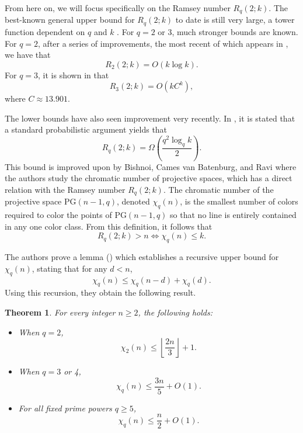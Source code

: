 \documentclass[12pt]{article}
\newtheorem{thm}{Theorem}[section]
\newcommand{\PG}{\text{PG}}
\begin{document}
From here on, we will focus specifically on the Ramsey number $R_q(2; k)$. The best-known general upper bound for $R_q(2; k)$ to date is still very large, a tower function dependent on $q$ and $k$ \cite{FredericksonYepremyan2023}. For $q = 2$ or $3$, much stronger bounds are known. For $q = 2$, after a series of improvements, the most recent of which appears in \cite{BishnoiCamesRavi2025}, we have that 
$$
R_2(2; k) = O(k \log k).
$$
For $q = 3$, it is shown in \cite{FredericksonYepremyan2023} that
$$
R_3(2; k) = O(kC^k),
$$
where $C \approx 13.901.$

The lower bounds have also seen improvement very recently. In \cite{FredericksonYepremyan2025}, it is stated that a standard probabilistic argument yields that 
$$
R_q(2; k) = \Omega\left(\frac{q^2 \log_qk}{2}\right).
$$
This bound is improved upon by Bishnoi, Cames van Batenburg, and Ravi \cite{BishnoiCamesRavi2025} where the authors study the chromatic number of projective spaces, which has a direct relation with the Ramsey number $R_q(2; k)$. The chromatic number of the projective space $\PG(n-1, q)$, denoted $\chi_q(n)$, is the smallest number of colors required to color the points of PG$(n-1, q)$ so that no line is entirely contained in any one color class. From this definition, it follows that 
\begin{equation}\label{Equiv}
R_q(2;k) > n \iff   \chi_q(n) \leq k.
\end{equation}

The authors prove a lemma (\cite[Lemma 1]{BishnoiCamesRavi2025}) which establishes a recursive upper bound for $\chi_q(n)$, stating that for any $d < n$, 
\begin{equation}\label{Recursion}
    \chi_q(n) \leq \chi_q(n-d) + \chi_q(d).
\end{equation}
Using this recursion, they obtain the following result.
\begin{thm}{\cite[Theorems 1 and 3]{BishnoiCamesRavi2025}}
    For every integer $n \geq 2$, the following holds:
    \begin{itemize}
        \item When $q = 2$, 
    $$
    \chi_2(n) \leq \left\lfloor \frac{2n}{3}\right\rfloor + 1.
    $$
        \item When $q = 3$ or 4,
    $$
    \chi_q(n) \leq \frac{3n}{5} + O(1).
    $$
        \item For all fixed prime powers $q \geq  5$, 
    $$
    \chi_q(n) \leq \frac{n}{2} +O(1).
    $$
    \end{itemize}
\end{thm}
\end{document}
